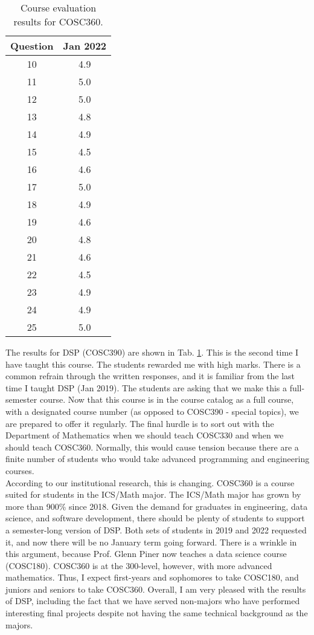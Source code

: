 \documentclass[../../main.tex]{subfiles}
\begin{document}
\begin{table}
\footnotesize
\centering
\begin{tabular}{| c | c |}
\hline
\hline
Question & Jan 2022 \\ \hline
10 & 4.9 \\ \hline
11 & 5.0 \\ \hline
12 & 5.0 \\ \hline
13 & 4.8 \\ \hline
14 & 4.9 \\ \hline
15 & 4.5 \\ \hline
16 & 4.6 \\ \hline
17 & 5.0 \\ \hline
18 & 4.9 \\ \hline
19 & 4.6 \\ \hline
20 & 4.8 \\ \hline
21 & 4.6 \\ \hline
22 & 4.5 \\ \hline
23 & 4.9 \\ \hline
24 & 4.9 \\ \hline
25 & 5.0 \\ \hline
\hline
\end{tabular}
\caption{\label{tab:eval_dsp} Course evaluation results for COSC360.}
\end{table}

The results for DSP (COSC390) are shown in Tab. \ref{tab:eval_dsp}.  This is the second time I have taught this course.  The students rewarded me with high marks.  There is a common refrain through the written responses, and it is familiar from the last time I taught DSP (Jan 2019).  The students are asking that we make this a full-semester course.  Now that this course is in the course catalog as a full course, with a designated course number (as opposed to COSC390 - special topics), we are prepared to offer it regularly.  The final hurdle is to sort out with the Department of Mathematics when we should teach COSC330 and when we should teach COSC360.  Normally, this would cause tension because there are a finite number of students who would take advanced programming and engineering courses.
\\
\vspace{0.25cm}
According to our institutional research, this is changing.  COSC360 is a course suited for students in the ICS/Math major.  The ICS/Math major has grown by more than 900\% since 2018.  Given the demand for graduates in engineering, data science, and software development, there should be plenty of students to support a semester-long version of DSP.  Both sets of students in 2019 and 2022 requested it, and now there will be no January term going forward.  There is a wrinkle in this argument, because Prof. Glenn Piner now teaches a data science course (COSC180).  COSC360 is at the 300-level, however, with more advanced mathematics.  Thus, I expect first-years and sophomores to take COSC180, and juniors and seniors to take COSC360.  Overall, I am very pleased with the results of DSP, including the fact that we have served non-majors who have performed interesting final projects despite not having the same technical background as the majors.
\end{document}
